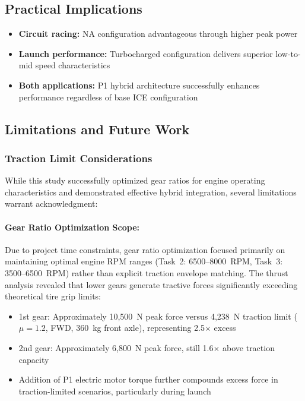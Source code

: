 \subsection{Practical Implications}

\begin{itemize}
    \item \textbf{Circuit racing:} NA configuration advantageous through higher peak power
    \item \textbf{Launch performance:} Turbocharged configuration delivers superior low-to-mid speed characteristics
    \item \textbf{Both applications:} P1 hybrid architecture successfully enhances performance regardless of base ICE configuration
\end{itemize}

\subsection{Limitations and Future Work}

\subsubsection{Traction Limit Considerations}

While this study successfully optimized gear ratios for engine operating characteristics and demonstrated effective hybrid integration, several limitations warrant acknowledgment:

\paragraph{Gear Ratio Optimization Scope:}
Due to project time constraints, gear ratio optimization focused primarily on maintaining optimal engine RPM ranges (Task~2: 6500--8000~RPM, Task~3: 3500--6500~RPM) rather than explicit traction envelope matching. The thrust analysis revealed that lower gears generate tractive forces significantly exceeding theoretical tire grip limits:

\begin{itemize}
    \item 1st gear: Approximately 10,500~N peak force versus 4,238~N traction limit ($\mu = 1.2$, FWD, 360~kg front axle), representing 2.5$\times$ excess
    \item 2nd gear: Approximately 6,800~N peak force, still 1.6$\times$ above traction capacity
    \item Addition of P1 electric motor torque further compounds excess force in traction-limited scenarios, particularly during launch
\end{itemize}

